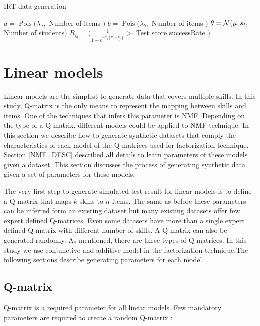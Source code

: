\begin{algorithm}
\caption{IRT data generation}
\label{CHalgorithm}
\begin{algorithmic}[1]
\State $a = \operatorname{Pois} ({\lambda_a},$ Number of items $)$
\State $b = \operatorname{Pois} ({\lambda_b},$ Number of items $)$
\State $\theta = \mathcal{N}(\mu, s_t ,$ Number of students$)$
\State $R_{ij} = (\frac{1}{1+e^{-a_j(\theta_i-b_j)}} >$ Test score successRate $)$
\EndFor
\EndFor
\end{algorithmic}
\label{Alg:IRTGen}
\end{algorithm}






\section{Linear models}
Linear models are the simplest to generate data that covers multiple skills. In this study, Q-matrix is the only means to represent the mapping between skills and items. One of the techniques that infers this parameter is NMF. Depending on the type of a Q-matrix, different models could be applied to NMF technique. In this section we describe how to generate synthetic datasets that comply the characteristics of each model of the Q-matrices used for factorization technique. Section \ref{NMF_DESC} described all details to learn parameters of these models given a dataset. This section discusses the process of generating synthetic data given a set of parameters for these models.

The very first step to generate simulated test result for linear models is to define a Q-matrix that maps $k$ skills to $n$ items. The same as before these parameters can be inferred form an existing dataset but many existing datasets offer few expert defined Q-matrices. Even some datasets have more than a single expert defined Q-matrix with different number of skills. A Q-matrix can also be generated randomly. As mentioned, there are three types of Q-matrices. In this study we use conjunctive and additive model in the factorization technique.The following sections describe generating parameters for each model.

\subsection{Q-matrix}
\label{Q-MatrixObtain}
Q-matrix is a required parameter for all linear models. Few mandatory parameters are required to create a random Q-matrix :

